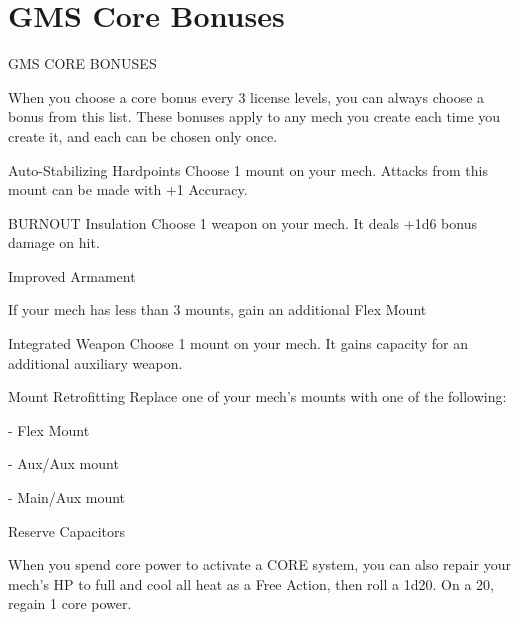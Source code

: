 \section{GMS Core Bonuses}
                                      GMS CORE BONUSES  

When you choose a core bonus every 3 license levels, you can always choose a bonus from this  
list. These bonuses apply to any mech you create each time you create it, and each can be  
chosen only once.
 

Auto-Stabilizing Hardpoints  
Choose 1 mount on your mech. Attacks from this mount can be made with +1 Accuracy.
 

BURNOUT Insulation  
Choose 1 weapon on your mech. It deals +1d6 bonus damage on hit.
 

Improved Armament
 
If your mech has less than 3 mounts, gain an additional Flex Mount
 

Integrated Weapon  
Choose 1 mount on your mech. It gains capacity for an additional auxiliary weapon.
 

Mount Retrofitting  
Replace one of your mech’s mounts with one of the following:
 
	       - Flex Mount
 
	       - Aux/Aux mount
 
	       - Main/Aux mount
 

Reserve Capacitors
 
When you spend core power to activate a CORE system, you can also repair your mech’s HP to  
full and cool all heat as a Free Action, then roll a 1d20. On a 20, regain 1 core power.
 
